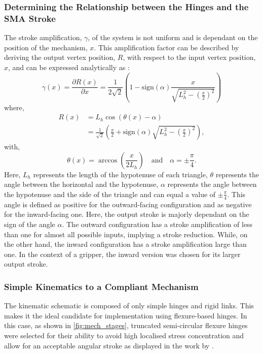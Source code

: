 \subsubsection{Determining the Relationship between the Hinges and the SMA Stroke}
The stroke amplification, $\gamma$, of the system is not uniform and is dependant on the position of the mechanism, $x$. This amplification factor can be described by deriving the output vertex position, $R$, with respect to the input vertex position, $x$, and can be expressed analytically as :
\begin{equation}
\gamma(x) = \frac{\partial R(x)}{\partial x} = \frac{1}{2\sqrt{2}}\left(1-\text{sign}(\alpha)\frac{x}{\sqrt{L_{h}^2-\left(\frac{x}{2}\right)^2}} \right)
\label{eq:1}
\end{equation}
where,
\begin{equation}
\begin{split}
    R(x) &= L_{h}\cos\left(\theta(x) - \alpha\right)\\
     &= \frac{1}{\sqrt{2}} \left(\frac{x}{2} +\text{sign}(\alpha) \sqrt{L_{h}^2-\left(\frac{x}{2}\right)^2}\right),
    \label{eq:7}
\end{split}
\end{equation}
with,
\begin{equation}
\theta(x) = \arccos{\left(\frac{x}{2L_{h}}\right)} \quad \text{and} \quad \alpha=\pm\frac{\pi}{4}.
\label{eq:theta}
\end{equation}
Here, $L_h$ represents the length of the hypotenuse of each triangle, $\theta$ represents the angle between the horizontal and the hypotenuse, $\alpha$ represents the angle between the hypotenuse and the side of the triangle and can equal a value of $\pm\frac{\pi}{4}$. This angle is defined as positive for the outward-facing configuration and as negative for the inward-facing one. Here, the output stroke is majorly dependant on the sign of the angle $\alpha$. The outward configuration has a stroke amplification of less than one for almost all possible inputs, implying a stroke reduction. While, on the other hand, the inward configuration has a stroke amplification large than one. In the context of a gripper, the inward version was chosen for its larger output stroke.

\subsubsection{Simple Kinematics to a Compliant Mechanism}
The kinematic schematic is composed of only simple hinges and rigid links. This makes it the ideal candidate for implementation using flexure-based hinges. In this case, as shown in \cref{fig:mech_stages}, truncated semi-circular flexure hinges were selected for their ability to avoid high localised stress concentration and allow for an acceptable angular stroke as displayed in the work by \todocite.

